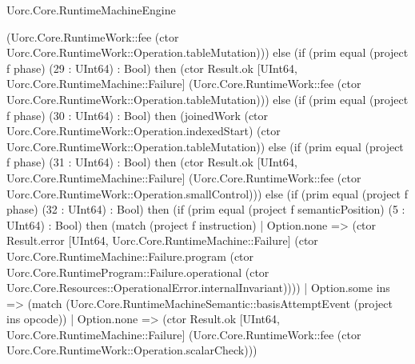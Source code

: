 \begin{lexlean}{Uorc.Core.RuntimeMachineEngine}
\begin{semanticmodule}
{(Uorc.Core.RuntimeWork::fee (ctor Uorc.Core.RuntimeWork::Operation.tableMutation))) else (if (prim equal (project f phase) (29 : UInt64) : Bool) then (ctor Result.ok [UInt64, Uorc.Core.RuntimeMachine::Failure] (Uorc.Core.RuntimeWork::fee (ctor Uorc.Core.RuntimeWork::Operation.tableMutation))) else (if (prim equal (project f phase) (30 : UInt64) : Bool) then (joinedWork (ctor Uorc.Core.RuntimeWork::Operation.indexedStart) (ctor Uorc.Core.RuntimeWork::Operation.tableMutation)) else (if (prim equal (project f phase) (31 : UInt64) : Bool) then (ctor Result.ok [UInt64, Uorc.Core.RuntimeMachine::Failure] (Uorc.Core.RuntimeWork::fee (ctor Uorc.Core.RuntimeWork::Operation.smallControl))) else (if (prim equal (project f phase) (32 : UInt64) : Bool) then (if (prim equal (project f semanticPosition) (5 : UInt64) : Bool) then (match (project f instruction)
      | Option.none => (ctor Result.error [UInt64, Uorc.Core.RuntimeMachine::Failure] (ctor Uorc.Core.RuntimeMachine::Failure.program (ctor Uorc.Core.RuntimeProgram::Failure.operational (ctor Uorc.Core.Resources::OperationalError.internalInvariant))))
      | Option.some ins => (match (Uorc.Core.RuntimeMachineSemantic::basisAttemptEvent (project ins opcode))
        | Option.none => (ctor Result.ok [UInt64, Uorc.Core.RuntimeMachine::Failure] (Uorc.Core.RuntimeWork::fee (ctor Uorc.Core.RuntimeWork::Operation.scalarCheck)))
}
\end{semanticmodule}
\end{lexlean}
